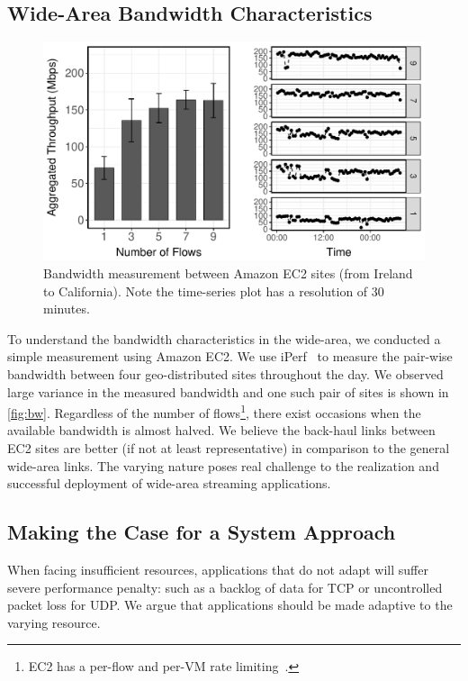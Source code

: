 \subsection{Wide-Area Bandwidth Characteristics}
\label{sec:making-case-adapt}

\begin{figure}
  \centering
  \includegraphics[width=.95\linewidth]{figures/europe-to-us-west.pdf}
  \caption{Bandwidth measurement between Amazon EC2 sites (from Ireland to
    California). Note the time-series plot has a resolution of 30 minutes.}
  \label{fig:bw}
\end{figure}

To understand the bandwidth characteristics in the wide-area, we conducted a
simple measurement using Amazon EC2. We use iPerf~\cite{iperf} to measure the
pair-wise bandwidth between four geo-distributed sites throughout the day. We
observed large variance in the measured bandwidth and one such pair of sites is
shown in \autoref{fig:bw}. Regardless of the number of flows\footnote{EC2 has a
  per-flow and per-VM rate limiting~\cite{zhang2016guaranteeing}.}, there exist
occasions when the available bandwidth is almost halved. We believe the
back-haul links between EC2 sites are better (if not at least representative) in
comparison to the general wide-area links. The varying nature poses real
challenge to the realization and successful deployment of wide-area streaming
applications.

\subsection{Making the Case for a System Approach}
\label{sec:bat}

When facing insufficient resources, applications that do not adapt will suffer
severe performance penalty: such as a backlog of data for TCP or uncontrolled
packet loss for UDP. We argue that applications should be made adaptive to the
varying resource.

